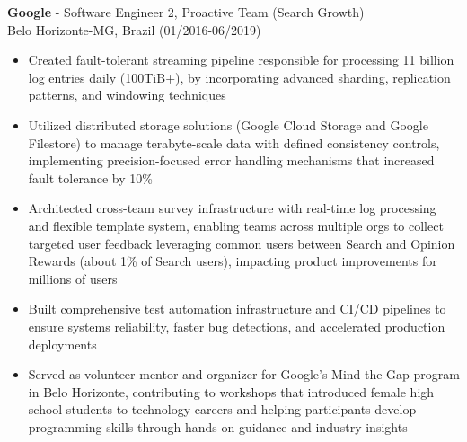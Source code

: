 
\normalsize{\textbf{Google} - Software Engineer 2, Proactive Team (Search Growth)}\\
\footnotesize{Belo Horizonte-MG, Brazil (01/2016-06/2019)}

\begin{itemize}
    \item \small{Created fault-tolerant streaming pipeline responsible for processing 11 billion log entries daily (100TiB+), by incorporating advanced sharding, replication patterns, and windowing techniques}

    \item \small{Utilized distributed storage solutions (Google Cloud Storage and Google Filestore) to manage terabyte-scale data with defined consistency controls, implementing precision-focused error handling mechanisms that increased fault tolerance by 10\%}

    \item \small{Architected cross-team survey infrastructure with real-time log processing and flexible template system, enabling teams across multiple orgs to collect targeted user feedback leveraging common users between Search and Opinion Rewards (about 1\% of Search users), impacting product improvements for millions of users}

    \item \small{Built comprehensive test automation infrastructure and CI/CD pipelines to ensure systems reliability, faster bug detections, and accelerated production deployments}

    \clearpage

    \item \small{Served as volunteer mentor and organizer for Google's Mind the Gap program in Belo Horizonte, contributing to workshops that introduced female high school students to technology careers and helping participants develop programming skills through hands-on guidance and industry insights}
\end{itemize}